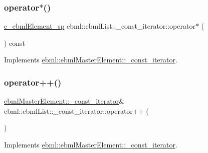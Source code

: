 \subsubsection{\texorpdfstring{operator$\ast$()}{operator*()}}
{\footnotesize\ttfamily \mbox{\hyperlink{namespaceebml_a2deef4e8071531b32e3533f1bf978917}{c\+\_\+ebml\+Element\+\_\+sp}} ebml\+::ebml\+List\+::\+\_\+const\+\_\+iterator\+::operator$\ast$ (\begin{DoxyParamCaption}{ }\end{DoxyParamCaption}) const\hspace{0.3cm}{\ttfamily [virtual]}}



Implements \mbox{\hyperlink{classebml_1_1ebmlMasterElement_1_1__const__iterator_aa3e5459826695a9043745fbbaea9cd47}{ebml\+::ebml\+Master\+Element\+::\+\_\+const\+\_\+iterator}}.

\mbox{\label{classebml_1_1ebmlList_1_1__const__iterator_a20f27b727326834e8b2a1c1dd66ffbce}} 
\subsubsection{\texorpdfstring{operator++()}{operator++()}}
{\footnotesize\ttfamily \mbox{\hyperlink{classebml_1_1ebmlMasterElement_1_1__const__iterator}{ebml\+Master\+Element\+::\+\_\+const\+\_\+iterator}}\& ebml\+::ebml\+List\+::\+\_\+const\+\_\+iterator\+::operator++ (\begin{DoxyParamCaption}{ }\end{DoxyParamCaption})\hspace{0.3cm}{\ttfamily [virtual]}}



Implements \mbox{\hyperlink{classebml_1_1ebmlMasterElement_1_1__const__iterator_a439f540325443a3c3a3acdcd8df81553}{ebml\+::ebml\+Master\+Element\+::\+\_\+const\+\_\+iterator}}.

\mbox{\label{classebml_1_1ebmlList_1_1__const__iterator_a10b96fa207ad1c24cb2374c1ee417646}} 

